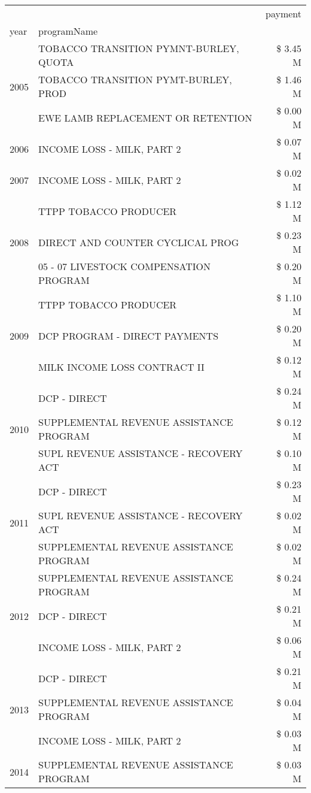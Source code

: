 \begin{tabular}{llr}
\toprule
 &  & payment \\
year & programName &  \\
\midrule
\multirow[t]{3}{*}{2005} & TOBACCO TRANSITION PYMNT-BURLEY, QUOTA & \$ 3.45 M \\
 & TOBACCO TRANSITION PYMT-BURLEY, PROD & \$ 1.46 M \\
 & EWE LAMB REPLACEMENT OR RETENTION & \$ 0.00 M \\
\cline{1-3}
2006 & INCOME LOSS - MILK, PART 2 & \$ 0.07 M \\
\cline{1-3}
2007 & INCOME LOSS - MILK, PART 2 & \$ 0.02 M \\
\cline{1-3}
\multirow[t]{3}{*}{2008} & TTPP TOBACCO PRODUCER & \$ 1.12 M \\
 & DIRECT AND COUNTER CYCLICAL PROG & \$ 0.23 M \\
 & 05 - 07 LIVESTOCK COMPENSATION PROGRAM & \$ 0.20 M \\
\cline{1-3}
\multirow[t]{3}{*}{2009} & TTPP TOBACCO PRODUCER & \$ 1.10 M \\
 & DCP PROGRAM - DIRECT PAYMENTS & \$ 0.20 M \\
 & MILK INCOME LOSS CONTRACT II & \$ 0.12 M \\
\cline{1-3}
\multirow[t]{3}{*}{2010} & DCP - DIRECT & \$ 0.24 M \\
 & SUPPLEMENTAL REVENUE ASSISTANCE PROGRAM & \$ 0.12 M \\
 & SUPL REVENUE ASSISTANCE - RECOVERY ACT & \$ 0.10 M \\
\cline{1-3}
\multirow[t]{3}{*}{2011} & DCP - DIRECT & \$ 0.23 M \\
 & SUPL REVENUE ASSISTANCE - RECOVERY ACT & \$ 0.02 M \\
 & SUPPLEMENTAL REVENUE ASSISTANCE PROGRAM & \$ 0.02 M \\
\cline{1-3}
\multirow[t]{3}{*}{2012} & SUPPLEMENTAL REVENUE ASSISTANCE PROGRAM & \$ 0.24 M \\
 & DCP - DIRECT & \$ 0.21 M \\
 & INCOME LOSS - MILK, PART 2 & \$ 0.06 M \\
\cline{1-3}
\multirow[t]{3}{*}{2013} & DCP - DIRECT & \$ 0.21 M \\
 & SUPPLEMENTAL REVENUE ASSISTANCE PROGRAM & \$ 0.04 M \\
 & INCOME LOSS - MILK, PART 2 & \$ 0.03 M \\
\cline{1-3}
\multirow[t]{3}{*}{2014} & SUPPLEMENTAL REVENUE ASSISTANCE PROGRAM & \$ 0.03 M \\

\end{tabular}
